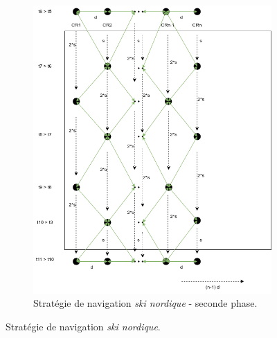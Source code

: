 \documentclass[francais,RandD]{rapportPFE}
\begin{document}
\begin{figure}[h!]
\begin{subfigure}[t]{0.45\linewidth}
						\includegraphics[width=\linewidth]{graphics/ski_nordique_2.png}
						\caption{Stratégie de navigation \textit{ski nordique} - seconde phase.}
						\label{fig:ski_nordique_2}
					\end{subfigure}
					\caption{Stratégie de navigation \textit{ski nordique}.}
					\label{fig:ski_nordique}
				\end{figure}
\end{document}
